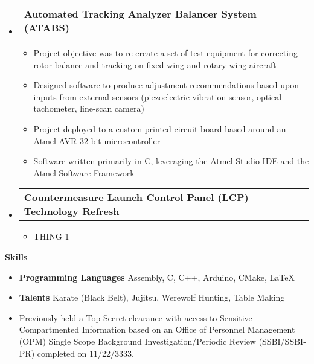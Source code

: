 \documentclass[letterpaper,12pt]{article}
\makeatletter
\def \entryspacing {-0pt}
\renewcommand{\section}[2]{\vspace{5pt}
  \colorbox{secondary}{\color{white}\raggedbottom\normalsize\textbf{{#1}{\hspace{7pt}#2}}}
}
\newcommand{\resumeEntryStart}{\begin{itemize}[leftmargin=2.5mm]}
\newcommand{\resumeEntryEnd}{\end{itemize}\vspace{\entryspacing}}
\newcommand{\resumeItemListStart}{\begin{itemize}[leftmargin=4.5mm]}
\newcommand{\resumeItemListEnd}{\end{itemize}}
\newcommand{\resumeItem}[1]{
  \item\small{
    {#1 \vspace{-2pt}}
  }
}
\newcommand{\resumeEntryTD}[2]{
  \vspace{-1pt}\item[]
    \begin{tabular*}{0.97\textwidth}{l@{\extracolsep{\fill}}r}
      \textbf{\color{primary}#1} & {\firabook\color{accent}\small#2} \\
    \end{tabular*}\vspace{-6pt}
}
\newcommand{\resumeEntryS}[2]{
  \item[]\small{
    \textbf{\color{primary}#1 }{ #2 \vspace{-6pt}}
  }
}
\makeatother
\begin{document}
  \resumeEntryStart
    \resumeEntryTD
      {Automated Tracking Analyzer Balancer System (ATABS)}{}
    \resumeItemListStart
      \resumeItem {Project objective was to re-create a set of test equipment for correcting rotor balance and tracking on fixed-wing and rotary-wing aircraft}
      \resumeItem {Designed software to produce adjustment recommendations based upon inputs from external sensors (piezoelectric vibration sensor, optical tachometer, line-scan camera)}
	  \resumeItem {Project deployed to a custom printed circuit board based around an Atmel AVR 32-bit microcontroller}
	  \resumeItem {Software written primarily in C, leveraging the Atmel Studio IDE and the Atmel Software Framework} 
    \resumeItemListEnd
  \resumeEntryEnd

  \resumeEntryStart
    \resumeEntryTD
      {Countermeasure Launch Control Panel (LCP) Technology Refresh}{}
    \resumeItemListStart
      \resumeItem {THING 1}
    \resumeItemListEnd
  \resumeEntryEnd

\section{\faToolbox}{Skills}
 \resumeEntryStart
  \resumeEntryS{Programming Languages } {Assembly, C, C++, Arduino, CMake, \LaTeX}
  \resumeEntryS{Talents } {Karate (Black Belt), Jujitsu, Werewolf Hunting, Table Making}
  \resumeEntryS{}{Previously held a Top Secret clearance with access to Sensitive Compartmented Information based on an Office of Personnel Management (OPM) Single Scope Background Investigation/Periodic Review (SSBI/SSBI-PR) completed on 11/22/3333.}
 \resumeEntryEnd
\end{document}
